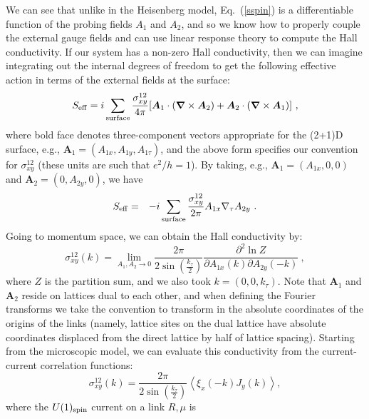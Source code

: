 \documentclass[prb,twocolumn]{revtex4-1}
\begin{document}
 We can see that unlike in the Heisenberg model, Eq.~(\ref{sspin}) is a differentiable function of the probing fields $A_1$ and $A_2$, and so we know how to properly couple the external gauge fields and can use linear response theory to compute the Hall conductivity. If our system has a non-zero Hall conductivity, then we can imagine integrating out the internal degrees of freedom to get the following effective action in terms of the external fields at the surface:
\begin{equation}
S_{\rm eff} = i \sum_{\rm surface} 
\frac{\sigma_{xy}^{12}}{4\pi} [{\bm A}_1 \cdot ({\bm \nabla} \times {\bm A}_2) + {\bm A}_2 \cdot ({\bm \nabla} \times {\bm A}_1)] ~,
\label{Seff}
\end{equation}
where bold face denotes three-component vectors appropriate for the (2+1)D surface, e.g., ${\bm A}_1 = (A_{1x}, A_{1y}, A_{1\tau})$, and the above form specifies our convention for $\sigma^{12}_{xy}$ (these units are such that $e^2/h=1$).  By taking, e.g., ${\bm A}_1 = (A_{1x}, 0, 0)$ and ${\bm A}_2 = (0, A_{2y}, 0)$, we have
\begin{eqnarray}
S_{\rm eff} &=& -i \sum_{\rm surface} \frac{\sigma_{xy}^{12}}{2\pi} A_{1x} \nabla_\tau A_{2y} ~.
\end{eqnarray}
Going to momentum space, we can obtain the Hall conductivity by:
\begin{equation}
\sigma_{xy}^{12}(k) = \lim_{A_1,A_2 \to 0} \frac{2\pi}{2 \sin(\frac{k_\tau}{2})}\frac{\partial^2 \ln Z}{\partial A_{1x}(k) \partial A_{2y}(-k)} ~,
\end{equation}
where $Z$ is the partition sum, and we also took $k = (0, 0, k_\tau)$.  Note that ${\bm A}_1$ and ${\bm A}_2$ reside on lattices dual to each other, and when defining the Fourier transforms we take the convention to transform in the absolute coordinates of the origins of the links (namely, lattice sites on the dual lattice have absolute coordinates displaced from the direct lattice by half of lattice spacing). 
Starting from the microscopic model, we can evaluate this conductivity from the current-current correlation functions:
\begin{equation}
\sigma_{xy}^{12}(k)=\frac{2\pi}{2\sin(\frac{k_\tau}{2})} \left\langle\xi_x(-k) J_y(k) \right\rangle,
\end{equation}
where the $U(1)_{\rm spin}$ current on a link $R,\mu$ is
\end{document}
